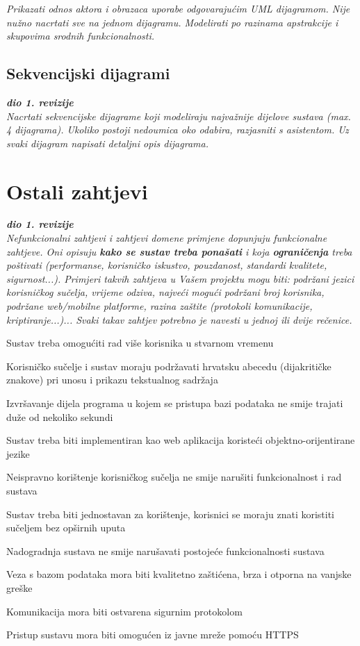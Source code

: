 					\textit{Prikazati odnos aktora i obrazaca uporabe odgovarajućim UML dijagramom. Nije nužno nacrtati sve na jednom dijagramu. Modelirati po razinama apstrakcije i skupovima srodnih funkcionalnosti.}
				\eject		
				
			\subsection{Sekvencijski dijagrami}
				
				\textbf{\textit{dio 1. revizije}}\\
				
				\textit{Nacrtati sekvencijske dijagrame koji modeliraju najvažnije dijelove sustava (max. 4 dijagrama). Ukoliko postoji nedoumica oko odabira, razjasniti s asistentom. Uz svaki dijagram napisati detaljni opis dijagrama.}
				\eject
	
		\section{Ostali zahtjevi}
		
			\textbf{\textit{dio 1. revizije}}\\
		 
			 \textit{Nefunkcionalni zahtjevi i zahtjevi domene primjene dopunjuju funkcionalne zahtjeve. Oni opisuju \textbf{kako se sustav treba ponašati} i koja \textbf{ograničenja} treba poštivati (performanse, korisničko iskustvo, pouzdanost, standardi kvalitete, sigurnost...). Primjeri takvih zahtjeva u Vašem projektu mogu biti: podržani jezici korisničkog sučelja, vrijeme odziva, najveći mogući podržani broj korisnika, podržane web/mobilne platforme, razina zaštite (protokoli komunikacije, kriptiranje...)... Svaki takav zahtjev potrebno je navesti u jednoj ili dvije rečenice.}
			 \begin{packed_item}
			 	\item Sustav treba omogućiti rad više korisnika u stvarnom vremenu
			 	\item Korisničko sučelje i sustav moraju podržavati hrvatsku abecedu (dijakritičke znakove) pri unosu i prikazu tekstualnog sadržaja
			 	\item Izvršavanje dijela programa u kojem se pristupa bazi podataka ne smije trajati duže od nekoliko sekundi
			 	\item Sustav treba biti implementiran kao web aplikacija koristeći objektno-orijentirane jezike
			 	\item Neispravno korištenje korisničkog sučelja ne smije narušiti funkcionalnost i rad sustava
			 	\item Sustav treba biti jednostavan za korištenje, korisnici se moraju znati koristiti sučeljem bez opširnih uputa 
			 	\item Nadogradnja sustava ne smije narušavati postojeće funkcionalnosti sustava
			 	\item Veza s bazom podataka mora biti kvalitetno zaštićena, brza i otporna na vanjske greške
			 	\item Komunikacija mora biti ostvarena sigurnim protokolom
			 	\item Pristup sustavu mora biti omogućen iz javne mreže pomoću HTTPS
			 \end{packed_item}
			 
			 
			 
	